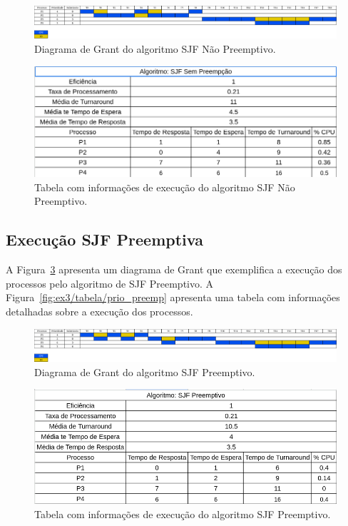 \documentclass[
	12pt,				%
	oneside,   	        %
	a4paper,			%
	english,			%
	french,				%
	spanish,			%
	brazil,				%
	]{pacotes/abntex2}
\begin{document}
\begin{figure}[H]
  \centering
  \includegraphics[scale=0.20]{figuras/ex3/diagrama/sjf_sem_preemp.png}
  \caption{Diagrama de Grant do algoritmo SJF Não Preemptivo.}
  \label{fig:ex3/diagrama/sjf_sem_preemp}
\end{figure}

\begin{figure}[H]
  \centering
  \includegraphics[scale=0.5]{figuras/ex3/tabela/sjf_sem_preemp.png}
  \caption{Tabela com informações de execução do algoritmo SJF Não Preemptivo.}
  \label{fig:ex3/tabela/sjf_sem_preemp}
\end{figure}

\subsection{Execução SJF Preemptiva}
\label{subsubsec:sjf_preemp}

A Figura~\ref{fig:ex3/diagrama/sjf_sem_preemp} apresenta um diagrama de Grant que exemplifica a execução dos processos pelo algoritmo de SJF Preemptivo. A Figura~\ref{fig:ex3/tabela/prio_preemp} apresenta uma tabela com informações detalhadas sobre a execução dos processos.

\begin{figure}[H]
  \centering
  \includegraphics[scale=0.20]{figuras/ex3/diagrama/sjf_preemp.png}
  \caption{Diagrama de Grant do algoritmo SJF Preemptivo.}
  \label{fig:ex3/diagrama/sjf_sem_preemp}
\end{figure}

\begin{figure}[H]
  \centering
  \includegraphics[scale=0.5]{figuras/ex3/tabela/sjf_preemp.png}
  \caption{Tabela com informações de execução do algoritmo SJF Preemptivo.}
  \label{fig:ex3/tabela/sjf_preemp}
\end{figure}
\end{document}
